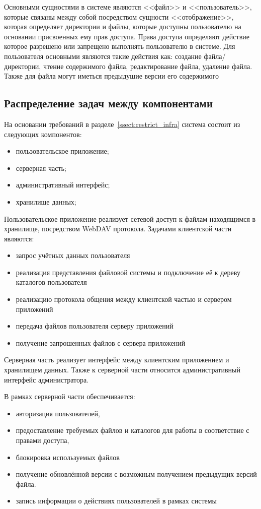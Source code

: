 \documentclass[utf8,usehyperref,12pt]{G7-32}
\begin{document}
Основными сущностями в системе являются <<файл>> и <<пользователь>>, которые связаны между собой посредством сущности <<отображение>>, которая определяет директории и файлы, которые доступны пользователю на основании присвоенных ему прав доступа.  Права доступа определяют действие которое разрешено или запрещено выполнять пользователю в системе. Для пользователя основными являются такие действия как: создание файла/директории, чтение содержимого файла, редактирование файла, удаление файла. Также для файла могут иметься предыдушие версии его содержимого

\subsection{Распределение задач между компонентами}

На основании требований в разделе~\ref{ssect:restrict_infra} система состоит из следующих компонентов:
\begin{itemize}
\item пользовательское приложение;
\item серверная часть;
\item административный интерфейс;
\item хранилище данных;
\end{itemize}

Пользовательское приложение реализует сетевой доступ к файлам находящимся в хранилище, посредством WebDAV протокола. Задачами клиентской части являются:
\begin{itemize}
\item запрос учётных данных пользователя
\item реализация представления файловой системы и подключение её к дереву каталогов пользователя
\item реализацию протокола общения между клиентской частью и сервером приложений
\item передача файлов пользователя серверу приложений
\item получение запрошенных файлов с сервера приложений
\end{itemize}

Серверная часть реализует интерфейс между клиентским приложением и хранилищем данных. Также к серверной части относится административный интерфейс администратора.

В рамках серверной части обеспечивается:
\begin{itemize}
\item авторизация пользователей, 
\item предоставление требуемых файлов и каталогов для работы в соответствие с правами доступа, 
\item блокировка используемых файлов 
\item получение обновлённой версии с возможным получением предыдущих версий файла.
\item запись информации о действиях пользователей в рамках системы
 \end{itemize}
 
\end{document}
